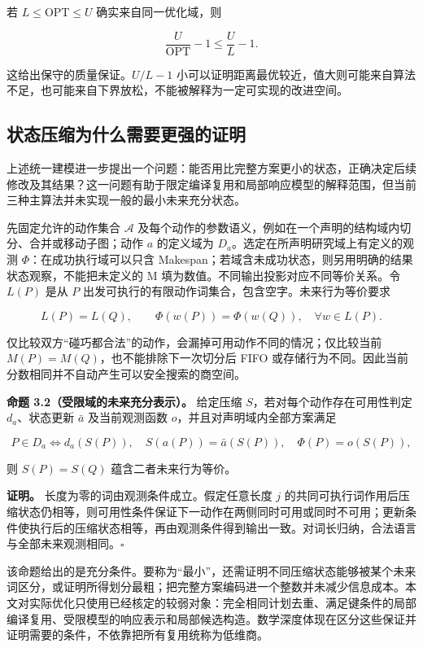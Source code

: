 \documentclass[anonymous,notoc]{gmcm2026}
\begin{document}
若 \(L\le\mathrm{OPT}\le U\) 确实来自同一优化域，则

\[\frac{U}{\mathrm{OPT}}-1\le\frac UL-1.\]

这给出保守的质量保证。\(U/L-1\) 小可以证明距离最优较近，值大则可能来自算法不足，也可能来自下界放松，不能被解释为一定可实现的改进空间。

\subsection{状态压缩为什么需要更强的证明}\label{ux72b6ux6001ux538bux7f29ux4e3aux4ec0ux4e48ux9700ux8981ux66f4ux5f3aux7684ux8bc1ux660e}

上述统一建模进一步提出一个问题：能否用比完整方案更小的状态，正确决定后续修改及其结果？这一问题有助于限定编译复用和局部响应模型的解释范围，但当前三种主算法并未实现一般的最小未来充分状态。

先固定允许的动作集合 \(\mathcal A\) 及每个动作的参数语义，例如在一个声明的结构域内切分、合并或移动子图；动作 \(a\) 的定义域为 \(D_a\)。选定在所声明研究域上有定义的观测 \(\Phi\)：在成功执行域可以只含 Makespan；若域含未成功状态，则另用明确的结果状态观察，不能把未定义的 M 填为数值。不同输出投影对应不同等价关系。令 \(L(P)\) 是从 \(P\) 出发可执行的有限动作词集合，包含空字。未来行为等价要求

\[L(P)=L(Q),\qquad \Phi(w(P))=\Phi(w(Q)),\quad\forall w\in L(P).\]

仅比较双方``碰巧都合法''的动作，会漏掉可用动作不同的情况；仅比较当前 \(M(P)=M(Q)\)，也不能排除下一次切分后 FIFO 或存储行为不同。因此当前分数相同并不自动产生可以安全搜索的商空间。

\textbf{命题 3.2（受限域的未来充分表示）。} 给定压缩 \(S\)，若对每个动作存在可用性判定 \(d_a\)、状态更新 \(\bar a\) 及当前观测函数 \(o\)，并且对声明域内全部方案满足

\[P\in D_a\iff d_a(S(P)),\quad S(a(P))=\bar a(S(P)),\quad\Phi(P)=o(S(P)),\]

则 \(S(P)=S(Q)\) 蕴含二者未来行为等价。

\textbf{证明。} 长度为零的词由观测条件成立。假定任意长度 \(j\) 的共同可执行词作用后压缩状态仍相等，则可用性条件保证下一动作在两侧同时可用或同时不可用；更新条件使执行后的压缩状态相等，再由观测条件得到输出一致。对词长归纳，合法语言与全部未来观测相同。\(\square\)

该命题给出的是充分条件。要称为``最小''，还需证明不同压缩状态能够被某个未来词区分，或证明所得划分最粗；把完整方案编码进一个整数并未减少信息成本。本文对实际优化只使用已经核定的较弱对象：完全相同计划去重、满足键条件的局部编译复用、受限模型的响应表示和局部候选构造。数学深度体现在区分这些保证并证明需要的条件，不依靠把所有复用统称为低维商。
\end{document}
